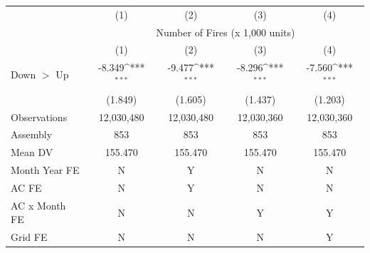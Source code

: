 {
\def\sym#1{\ifmmode^{#1}\else\(^{#1}\)\fi}
\begin{tabular}{l*{4}{c}}
\hline
            &\multicolumn{1}{c}{(1)}         &\multicolumn{1}{c}{(2)}         &\multicolumn{1}{c}{(3)}         &\multicolumn{1}{c}{(4)}         \\
            & \multicolumn{4}{c}{Number of Fires (x 1,000 units)} \\ \hline
            &\multicolumn{1}{c}{(1)}         &\multicolumn{1}{c}{(2)}         &\multicolumn{1}{c}{(3)}         &\multicolumn{1}{c}{(4)}         \\
\hline
Down $>$ Up &      -8.349\sym{***}&      -9.477\sym{***}&      -8.296\sym{***}&      -7.560\sym{***}\\
            &     (1.849)         &     (1.605)         &     (1.437)         &     (1.203)         \\
\hline
Observations&  12,030,480         &  12,030,480         &  12,030,360         &  12,030,360         \\
Assembly    &         853         &         853         &         853         &         853         \\
Mean DV     &     155.470         &     155.470         &     155.470         &     155.470         \\
Month Year FE&           N         &           Y         &           N         &           N         \\
AC FE       &           N         &           Y         &           N         &           N         \\
AC x Month FE&           N         &           N         &           Y         &           Y         \\
Grid FE     &           N         &           N         &           N         &           Y         \\
\hline
\end{tabular}
}
